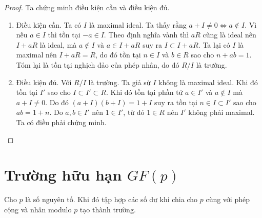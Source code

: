 \begin{proof}
    Ta chứng minh điều kiện cần và điều kiện đủ.
    \begin{enumerate}
        \item Điều kiện cần. Ta có $I$ là maximal ideal. Ta thấy rằng
        $a + I \neq 0 \Leftrightarrow a \not\in I$. Vì nếu $a \in I$ thì 
        tồn tại $-a \in I$. Theo định nghĩa vành thì $a R$ cũng là ideal
        nên $I + a R$ là ideal, mà $a \not\in I$ và $a \in I + a R$ suy ra
        $I \subset I + a R$. Ta lại có $I$ là maximal nên $I + aR = R$, 
        do đó tồn tại $n \in I$ và $b \in R$ sao cho $n + ab = 1$. Tóm 
        lại là tồn tại nghịch đảo của phép nhân, do đó $R / I$ là trường.
        \item Điều kiện đủ. Với $R / I$ là trường. Ta giả sử $I$ không là
        maximal ideal. Khi đó tồn tại $I'$ sao cho $I \subset I' \subset R$.
        Khi đó tồn tại phần tử $a \in I'$ và $a \not\in I$ mà $a + I \neq 0$.
        Do đó $(a + I) (b + I) = 1 + I$ suy ra tồn tại $n \in I \subset I'$ 
        sao cho $a b = 1 + n$. Do $a, b \in I'$ nên $1 \in I'$, từ đó
        $1 \in R$ nên $I'$ không phải maximal. Ta có điều phải chứng minh.
    \end{enumerate}
\end{proof}

\section{Trường hữu hạn $GF(p)$}

Cho $p$ là số nguyên tố. Khi đó tập hợp các số dư khi chia cho $p$ 
cùng với phép cộng và nhân modulo $p$ tạo thành trường.


